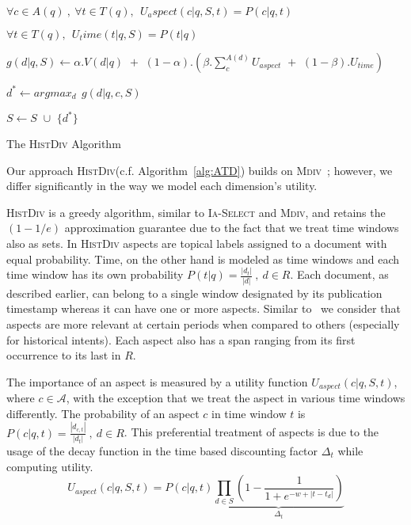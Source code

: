 \begin{algorithm}[!t]
  \small


  \nl$\forall c \in A(q) \: , \: \forall t \in T(q), \:\: U_aspect(c|q, S, t) = P(c|q,t)$

  \nl$\forall t \in T(q), \:\: U_time(t|q,S) = P(t|q)$

  \nl{}
  {
     
    \nl{}
    {
      \nl $g(d|q, S) \leftarrow  \alpha . V(d|q) \,\,+\,\, (1-\alpha).( \beta . \sum_{c}^{A(d)} U_{aspect}\,\, + \,\,(1-\beta). U_{time})$
    }

    \nl $d^{*} \leftarrow argmax_{d} \:\: g(d|q, c, S)$

    \nl $S \leftarrow S \,\,\cup \,\, \{d^{*}\}$
  }

  \nl{}

  \BlankLine

  \caption{The \textsc{HistDiv} Algorithm}
  \vspace{-2mm}
  \label{alg:ATD}
\end{algorithm}


Our approach \textsc{HistDiv}(c.f. Algorithm~\ref{alg:ATD}) builds on \textsc{Mdiv}~\cite{mdiv}; however, we differ significantly in the way we model each dimension's utility. 

\textsc{HistDiv} is a greedy algorithm, similar to \textsc{Ia-Select} and \textsc{Mdiv}, and retains the $(1-1/e)$ approximation guarantee due to the fact that we treat time windows also as sets. In \textsc{HistDiv} aspects are topical labels assigned to a document with equal probability. Time, on the other hand is modeled as time windows and each time window has its own probability $P(t|q) = \frac{|d_t|}{|d|} \:,\: d \in R$. Each document, as described earlier, can belong to a single window designated by its publication timestamp whereas it can have one or more aspects. Similar to~\cite{zhou2013impact} we consider that aspects are more relevant at certain periods when compared to others (especially for historical intents). Each aspect also has a span ranging from its first occurrence to its last in $R$.

The importance of an aspect is measured by a utility function $U_{aspect}(c|q, S, t)$, where $c \in \mathcal{A}$, with the exception that we treat the aspect in various time windows differently. The probability of an aspect $c$ in time window $t$ is $P(c|q,t) = \frac{|d_{c,t}|}{|d_{t}|} \:,\: d \in R$. This preferential treatment of aspects is due to the usage of the decay function in the time based discounting factor $\Delta_t$ while computing utility.
\begin{equation}
	U_{aspect}(c|q, S, t) = P(c|q,t)  \underbrace{\prod_{d \in S} \left ( 1 - \frac{1}{1+e^{-w+|t-t_d|}} \right )}_{\Delta_t} 
\end{equation}

